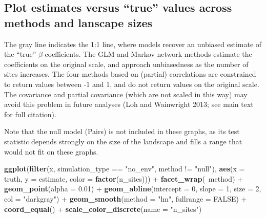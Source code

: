 \documentclass[11pt,]{article}
\newenvironment{Shaded}{\begin{snugshade}}{\end{snugshade}}
\newcommand{\KeywordTok}[1]{\textcolor[rgb]{0.13,0.29,0.53}{\textbf{{#1}}}}
\newcommand{\DataTypeTok}[1]{\textcolor[rgb]{0.13,0.29,0.53}{{#1}}}
\newcommand{\DecValTok}[1]{\textcolor[rgb]{0.00,0.00,0.81}{{#1}}}
\newcommand{\FloatTok}[1]{\textcolor[rgb]{0.00,0.00,0.81}{{#1}}}
\newcommand{\StringTok}[1]{\textcolor[rgb]{0.31,0.60,0.02}{{#1}}}
\newcommand{\OtherTok}[1]{\textcolor[rgb]{0.56,0.35,0.01}{{#1}}}
\newcommand{\NormalTok}[1]{{#1}}
\begin{document}
\subsection{\texorpdfstring{Plot estimates versus ``true'' values across
methods and lanscape
sizes}{Plot estimates versus true values across methods and lanscape sizes}}\label{plot-estimates-versus-true-values-across-methods-and-lanscape-sizes}

The gray line indicates the 1:1 line, where models recover an unbiased
estimate of the ``true'' \(\beta\) coefficients. The GLM and Markov
network methods estimate the coefficients on the original scale, and
approach unbiasedness as the number of sites increases. The four methods
based on (partial) correlations are constrained to return values between
-1 and 1, and do not return values on the original scale. The covariance
and partial covariance (which are not scaled in this way) may avoid this
problem in future analyses (Loh and Wainwright 2013; see main text for
full citation).

Note that the null model (Pairs) is not included in these graphs, as its
test statistic depends strongly on the size of the landscape and fills a
range that would not fit on these graphs.

\begin{Shaded}
\begin{Highlighting}[]
\KeywordTok{ggplot}\NormalTok{(}\KeywordTok{filter}\NormalTok{(x, simulation_type ==}\StringTok{ "no_env"}\NormalTok{, method !=}\StringTok{ "null"}\NormalTok{),}
       \KeywordTok{aes}\NormalTok{(}\DataTypeTok{x =} \NormalTok{truth, }\DataTypeTok{y =} \NormalTok{estimate, }\DataTypeTok{color =} \KeywordTok{factor}\NormalTok{(n_sites))) +}\StringTok{ }
\StringTok{  }\KeywordTok{facet_wrap}\NormalTok{(~method) +}
\StringTok{  }\KeywordTok{geom_point}\NormalTok{(}\DataTypeTok{alpha =} \FloatTok{0.01}\NormalTok{) +}
\StringTok{  }\KeywordTok{geom_abline}\NormalTok{(}\DataTypeTok{intercept =} \DecValTok{0}\NormalTok{, }\DataTypeTok{slope =} \DecValTok{1}\NormalTok{, }\DataTypeTok{size =} \DecValTok{2}\NormalTok{, }\DataTypeTok{col =} \StringTok{"darkgray"}\NormalTok{) +}\StringTok{ }
\StringTok{  }\KeywordTok{geom_smooth}\NormalTok{(}\DataTypeTok{method =} \StringTok{"lm"}\NormalTok{, }\DataTypeTok{fullrange =} \OtherTok{FALSE}\NormalTok{) +}\StringTok{ }
\StringTok{  }\KeywordTok{coord_equal}\NormalTok{() +}\StringTok{ }
\StringTok{  }\KeywordTok{scale_color_discrete}\NormalTok{(}\DataTypeTok{name =} \StringTok{"n_sites"}\NormalTok{)}
\end{Highlighting}
\end{Shaded}
\end{document}
